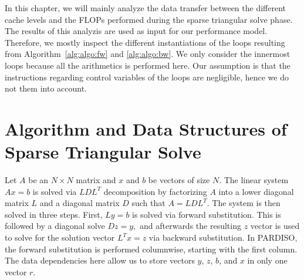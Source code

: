 In this chapter, we will mainly analyze the data transfer between the different cache levels and the FLOPs performed during the sparse triangular solve phase. The results of this analyzis are used as input for our performance model. Therefore, we mostly inspect the different instantiations of the loops resulting from Algorithm~\ref{alg:algo:fw} and \ref{alg:algo:bw}. We only consider the innermost loops because all the arithmetics is performed here. Our assumption is that the instructions regarding control variables of the loops are negligible, hence we do not them into account.

\section{Algorithm and Data Structures of Sparse Triangular Solve}

\label{sec:algo}

Let $A$ be an $N \times N$ matrix and $x$ and $b$ be vectors of size $N$.
The linear system $A x = b$ is solved via $LDL^T$ decomposition by factorizing $A$
into a lower diagonal matrix $L$ and a diagonal matrix $D$ 
such
that $A =
LDL^T$.
The system is then solved in three steps. First,
$
  \label{eq:fw}
  Ly=b
$
is solved via forward substitution. This is followed by a diagonal solve
$
  \label{eq:dg}
  Dz=y,
$
and afterwards the resulting $z$ vector is used to solve for the solution vector 
%
$
  \label{eq:bw}
  L^Tx=z
$
% 
via backward substitution. In 
PARDISO, 
the forward substitution is performed columnwise, starting with the
first column.
The data dependencies here allow us to store vectors $y$, $z$, $b$, and $x$ in
only one vector $r$. 


